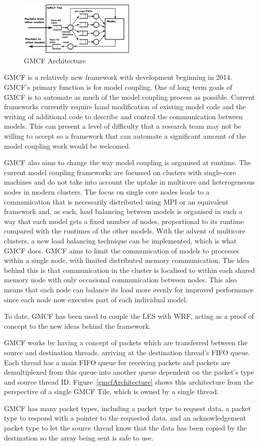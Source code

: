 \begin{figure}
    \includegraphics[width=0.5\textwidth]{graphs/gmcfArchitecture.png}
    \caption{GMCF Architecture}
    \label{fig:gmcfArchitecture}
\end{figure}

GMCF is a relatively new framework with development beginning in 2014. GMCF's
primary function is for model coupling. One of long term goals of GMCF is to
automate as much of the model coupling process as possible. Current frameworks
currently require hand modification of existing model code and the writing of
additional code to describe and control the communication between models. This
can present a level of difficulty that a research team may not be willing to
accept so a framework that can automate a significant amount of the model
coupling work would be welcomed.

GMCF also aims to change the way model coupling is organised at runtime. The
current model coupling frameworks are focussed on clusters with single-core
machines and do not take into account the uptake in multicore and heterogeneous
nodes in modern clusters. The focus on single core nodes leads to a
communication that is necessarily distributed using MPI or an equivalent
framework and, as such, load balancing between models is organised in such a way
that each model gets a fixed number of nodes, proportional to its runtime
compared with the runtimes of the other models. With the advent of multicore
clusters, a new load balancing technique can be implemented, which is what GMCF
does. GMCF aims to limit the communication of models to processes within a
single node, with limited distributed memory communication. The idea behind this
is that communication in the cluster is localised to within each shared memory
node with only occasional communication between nodes. This also means that each
node can balance its load more evenly for improved performance since each node
now executes part of each individual model.

To date, GMCF has been used to couple the LES with WRF, acting as a proof of
concept to the new ideas behind the framework.

GMCF works by having a concept of packets which are transferred between the
source and destination threads, arriving at the destination thread's FIFO queue.
Each thread has a main FIFO queue for receiving packets and packets are
demultiplexed from this queue into another queue dependent on the packet's type
and source thread ID. Figure~\ref{gmcfArchitecture} shows this architecture from
the perspective of a single GMCF Tile, which is owned by a single thread.

GMCF has many packet types, including a packet type to request data, a packet
type to respond with a pointer to the requested data, and an acknowledgement
packet type to let the source thread know that the data has been copied by the
destination so the array being sent is safe to use.
